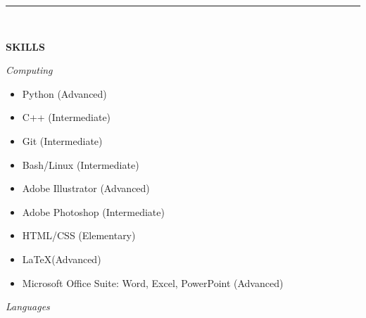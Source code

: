 \documentclass[12pt, b4paper]{cv}
\begin{document}
\pagebreak




\vspace{-0.15in}
\rule{\textwidth}{1pt}\\
\vspace{-0.15in}


{\Large \textbf{SKILLS}}
\vspace{5pt}

\textit{Computing}

\begin{multicols}{3}[]
	\begin{itemize}
	\setlength\itemsep{-0.7pt}
	  \item  Python (Advanced)
	  \item  C++ (Intermediate)
	  \item  Git (Intermediate)
	  \item  Bash/Linux (Intermediate)
	  \item  Adobe Illustrator (Advanced)
	  \item  Adobe Photoshop (Intermediate)
	  \item  HTML/CSS (Elementary)
	  \item  \LaTeX  (Advanced)
	  \item  Microsoft Office Suite: Word, Excel, PowerPoint (Advanced)
	\end{itemize}
\end{multicols}

\textit{Languages}
\end{document}
